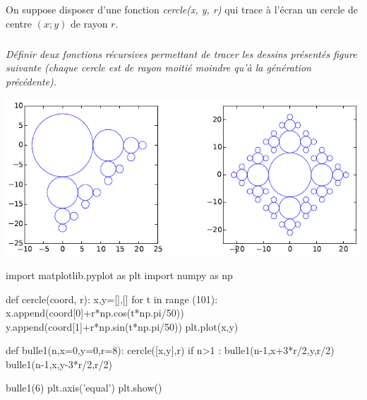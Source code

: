 \documentclass[10pt,fleqn]{article} %
\begin{document}
\begin{multicols}{2}
On suppose disposer d’une fonction \textsl{cercle(x, y, r)} qui trace à l’écran un cercle de centre
$(x;y)$ de rayon $r$. 
\subparagraph*{}
\textit{Définir deux fonctions récursives permettant de tracer les dessins présentés figure suivante (chaque cercle est de rayon moitié moindre qu’à la génération précédente).}

\begin{center}
\includegraphics[width=.95\linewidth]{images/fig_03}
\end{center}

\ifprof
\begin{corrige}
\begin{python}
import matplotlib.pyplot as plt
import numpy as np

def cercle(coord, r):
    x,y=[],[]
    for t in range (101):
        x.append(coord[0]+r*np.cos(t*np.pi/50))
        y.append(coord[1]+r*np.sin(t*np.pi/50))
    plt.plot(x,y)
    
    
def bulle1(n,x=0,y=0,r=8):
    cercle([x,y],r)
    if n>1 :
        bulle1(n-1,x+3*r/2,y,r/2)
        bulle1(n-1,x,y-3*r/2,r/2)

bulle1(6)
plt.axis('equal')
plt.show()
\end{python}
\end{corrige}
\else
\fi
\ifprof
\else
\end{multicols}
\fi
\end{document}
